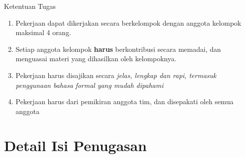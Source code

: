 \begin{infobox}{Ketentuan Tugas}
\begin{enumerate}
    \itemsep0em
     \item Pekerjaan dapat dikerjakan secara berkelompok dengan anggota kelompok maksimal 4 orang.
     \item Setiap anggota kelompok \textbf{harus} berkontribusi secara memadai, dan menguasai materi yang dihasilkan oleh kelompoknya.
     \item Pekerjaan harus disajikan secara \textit{jelas, lengkap dan rapi, termasuk penggunaan bahasa formal yang mudah dipahami}
     \item Pekerjaan harus dari pemikiran anggota tim, dan disepakati oleh semua anggota
\end{enumerate}  
\end{infobox}

\section{Detail Isi Penugasan}
